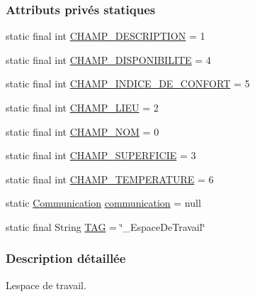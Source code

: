 \subsubsection*{Attributs privés statiques}
\begin{DoxyCompactItemize}
\item 
static final int \hyperlink{classcom_1_1lasalle_1_1meeting_1_1_espace_de_travail_a9284e3c1fd38eae57b74ca814b285586}{C\+H\+A\+M\+P\+\_\+\+D\+E\+S\+C\+R\+I\+P\+T\+I\+ON} = 1
\item 
static final int \hyperlink{classcom_1_1lasalle_1_1meeting_1_1_espace_de_travail_a74d29b35a8171181988487a87782f26f}{C\+H\+A\+M\+P\+\_\+\+D\+I\+S\+P\+O\+N\+I\+B\+I\+L\+I\+TE} = 4
\item 
static final int \hyperlink{classcom_1_1lasalle_1_1meeting_1_1_espace_de_travail_a51854896c3a74fc72477b4fe556cd519}{C\+H\+A\+M\+P\+\_\+\+I\+N\+D\+I\+C\+E\+\_\+\+D\+E\+\_\+\+C\+O\+N\+F\+O\+RT} = 5
\item 
static final int \hyperlink{classcom_1_1lasalle_1_1meeting_1_1_espace_de_travail_aec533da6058aa1eea7c92e4f6e174f1a}{C\+H\+A\+M\+P\+\_\+\+L\+I\+EU} = 2
\item 
static final int \hyperlink{classcom_1_1lasalle_1_1meeting_1_1_espace_de_travail_a30fbba6ac01606498fbc123f1bbeaf14}{C\+H\+A\+M\+P\+\_\+\+N\+OM} = 0
\item 
static final int \hyperlink{classcom_1_1lasalle_1_1meeting_1_1_espace_de_travail_a3f0b742c19d2e62d86c7a464d326e555}{C\+H\+A\+M\+P\+\_\+\+S\+U\+P\+E\+R\+F\+I\+C\+IE} = 3
\item 
static final int \hyperlink{classcom_1_1lasalle_1_1meeting_1_1_espace_de_travail_a71c8e2beaf3f0a5584eb614e5a68bd29}{C\+H\+A\+M\+P\+\_\+\+T\+E\+M\+P\+E\+R\+A\+T\+U\+RE} = 6
\item 
static \hyperlink{classcom_1_1lasalle_1_1meeting_1_1_communication}{Communication} \hyperlink{classcom_1_1lasalle_1_1meeting_1_1_espace_de_travail_adbda10d59725486cb1151c050a830114}{communication} = null
\item 
static final String \hyperlink{classcom_1_1lasalle_1_1meeting_1_1_espace_de_travail_a30a7c9d0d084360b166487dbcdf5bad1}{T\+AG} = \char`\"{}\+\_\+\+Espace\+De\+Travail\char`\"{}
\end{DoxyCompactItemize}


\subsubsection{Description détaillée}
L\textquotesingle{}espace de travail. 

